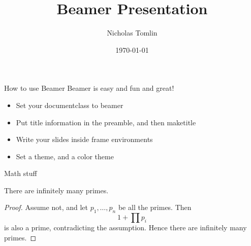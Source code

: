 \documentclass{beamer}
\title{Beamer Presentation}
\institute{Brown University}
\author{Nicholas Tomlin}
\date{\today}
\begin{document}
    \maketitle  
    \begin{frame}{How to use Beamer}
        Beamer is easy and fun and great!
        \begin{itemize}
            \pause
            \item Set your documentclass to beamer
            \pause
            \item Put title information in the preamble, and then maketitle
            \pause
            \item Write your slides inside frame environments
            \pause
            \item Set a theme, and a color theme
        \end{itemize}
    \end{frame}
    \begin{frame}{Math stuff}
    	\begin{theorem}
	There are infinitely many primes.
	\end{theorem}
	\begin{proof}
	Assume not, and let $p_1,\ldots,p_n$ be all the primes. Then $$1 + \prod p_i$$ is also a prime, contradicting the assumption. Hence there are infinitely many primes.
	\end{proof}
    \end{frame}
    \begin{frame}
    \end{frame}
\end{document}
